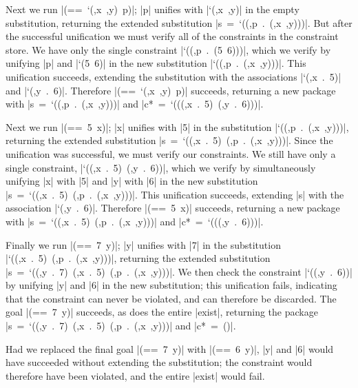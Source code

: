 Next we run \mbox{\scheme|(== `(,x ,y) p)|};
\mbox{\scheme|p|} unifies with \mbox{\scheme|`(,x ,y)|} in the empty substitution,
returning the extended substitution
\mbox{\scheme|s = `((,p . (,x ,y)))|}.  But after the successful unification we must verify
all of the constraints in the constraint store.  We have only the single constraint
\mbox{\scheme|`((,p . (5 6)))|}, which we verify by unifying \mbox{\scheme|p|} and
\mbox{\scheme|`(5 6)|} in the new substitution
\mbox{\scheme|`((,p . (,x ,y)))|}.  This unification succeeds, extending the substitution with the
associations \mbox{\scheme|`(,x . 5)|} and \mbox{\scheme|`(,y . 6)|}.  Therefore
\mbox{\scheme|(== `(,x ,y) p)|} succeeds, returning
a new package with \mbox{\scheme|s = `((,p . (,x ,y)))|} and
\mbox{\scheme|c* = `(((,x . 5) (,y . 6)))|}.

Next we run \mbox{\scheme|(== 5 x)|}; \mbox{\scheme|x|} unifies with \mbox{\scheme|5|}
in the substitution \mbox{\scheme|`((,p . (,x ,y)))|},
returning the extended substitution \mbox{\scheme|s = `((,x . 5) (,p . (,x ,y)))|}.
Since the unification
was successful, we must verify our constraints.
We still have only a single constraint, \mbox{\scheme|`((,x . 5) (,y . 6))|}, which we verify by
simultaneously unifying \mbox{\scheme|x|} with \mbox{\scheme|5|} and
\mbox{\scheme|y|} with \mbox{\scheme|6|} in the new substitution
\mbox{\scheme|s = `((,x . 5) (,p . (,x ,y)))|}. This unification succeeds, extending
\mbox{\scheme|s|} with the association
\mbox{\scheme|`(,y . 6)|}.  Therefore \mbox{\scheme|(== 5 x)|} succeeds,
returning a new package with
\mbox{\scheme|s = `((,x . 5) (,p . (,x ,y)))|} and \mbox{\scheme|c* = `(((,y . 6)))|}.

Finally we run \mbox{\scheme|(== 7 y)|}; \mbox{\scheme|y|} unifies with \mbox{\scheme|7|}
in the substitution \mbox{\scheme|`((,x . 5) (,p . (,x ,y)))|},
returning the extended substitution \mbox{\scheme|s = `((,y . 7) (,x . 5) (,p . (,x ,y)))|}.
We then check the constraint \mbox{\scheme|`((,y . 6))|} by unifying \mbox{\scheme|y|} and
\mbox{\scheme|6|} in the new substitution; this unification fails,
indicating that the constraint can never be violated, and can therefore be discarded.
The goal \mbox{\scheme|(== 7 y)|} succeeds, as does the entire \mbox{\scheme|exist|},
returning the package
\mbox{\scheme|s = `((,y . 7) (,x . 5) (,p . (,x ,y)))|} and \mbox{\scheme|c* = ()|}.

Had we replaced the final goal \mbox{\scheme|(== 7 y)|}
with \mbox{\scheme|(== 6 y)|}, \mbox{\scheme|y|} and \mbox{\scheme|6|}
would have succeeded without extending the substitution; the constraint
would therefore have been violated, and the entire \scheme|exist| would fail.


